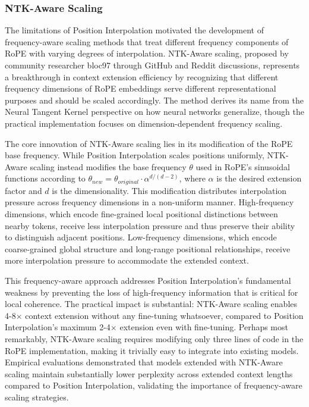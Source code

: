 \documentclass[11pt,letterpaper]{article}
\begin{document}
\subsubsection{NTK-Aware Scaling}

The limitations of Position Interpolation motivated the development of frequency-aware scaling methods that treat different frequency components of RoPE with varying degrees of interpolation. NTK-Aware scaling, proposed by community researcher bloc97 through GitHub and Reddit discussions, represents a breakthrough in context extension efficiency by recognizing that different frequency dimensions of RoPE embeddings serve different representational purposes and should be scaled accordingly. The method derives its name from the Neural Tangent Kernel perspective on how neural networks generalize, though the practical implementation focuses on dimension-dependent frequency scaling.

The core innovation of NTK-Aware scaling lies in its modification of the RoPE base frequency. While Position Interpolation scales positions uniformly, NTK-Aware scaling instead modifies the base frequency $\theta$ used in RoPE's sinusoidal functions according to $\theta_{new} = \theta_{original} \cdot \alpha^{d/(d-2)}$, where $\alpha$ is the desired extension factor and $d$ is the dimensionality. This modification distributes interpolation pressure across frequency dimensions in a non-uniform manner. High-frequency dimensions, which encode fine-grained local positional distinctions between nearby tokens, receive less interpolation pressure and thus preserve their ability to distinguish adjacent positions. Low-frequency dimensions, which encode coarse-grained global structure and long-range positional relationships, receive more interpolation pressure to accommodate the extended context.

This frequency-aware approach addresses Position Interpolation's fundamental weakness by preventing the loss of high-frequency information that is critical for local coherence. The practical impact is substantial: NTK-Aware scaling enables 4-8$\times$ context extension without any fine-tuning whatsoever, compared to Position Interpolation's maximum 2-4$\times$ extension even with fine-tuning. Perhaps most remarkably, NTK-Aware scaling requires modifying only three lines of code in the RoPE implementation, making it trivially easy to integrate into existing models. Empirical evaluations demonstrated that models extended with NTK-Aware scaling maintain substantially lower perplexity across extended context lengths compared to Position Interpolation, validating the importance of frequency-aware scaling strategies.
\end{document}
